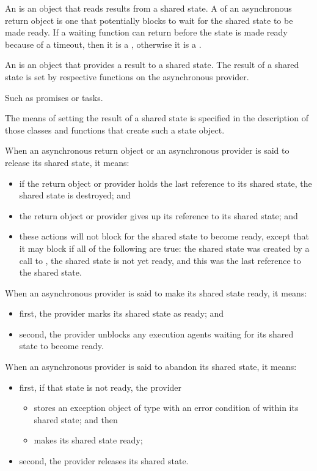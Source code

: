 \pnum
An  is an object that reads results from a
shared state. A  of an asynchronous return object is one
that potentially blocks to wait for the shared state to be made
ready.
If a waiting function can return before the state is made ready because of a
timeout, then it is a , otherwise
it is a .

\pnum
An  is an object that provides a result to a shared
state.
The result of a shared state is set by
respective functions on the asynchronous provider.
\begin{note}
Such as promises or tasks.
\end{note}
The means of setting the result of a shared state is specified
in the description of those classes and functions that create such a state object.

\pnum
When an asynchronous return object or an asynchronous provider is said to release its
shared state, it means:
\begin{itemize}
\item
if the return object or provider holds the last reference to its shared state,
the shared state is destroyed; and

\item
the return object or provider gives up its reference to its shared state; and

\item these actions will not block for the shared state to become ready, except that it
may block if all of the following are true: the shared state was created by a call to
, the shared state is not yet ready, and this was the last reference
to the shared state.
\end{itemize}

\pnum
When an asynchronous provider is said to make its shared state ready, it means:
\begin{itemize}
\item
first, the provider marks its shared state as ready; and
\item
second, the provider unblocks any execution agents waiting for its shared
state to become ready.
\end{itemize}

\pnum
When an asynchronous provider is said to abandon its shared state, it means:
\begin{itemize}
\item
first, if that state is not ready, the provider
\begin{itemize}
\item
stores an exception object of type  with an error condition of
 within its shared state; and then
\item
makes its shared state ready;
\end{itemize}
\item
second, the provider releases its shared state.
\end{itemize}


